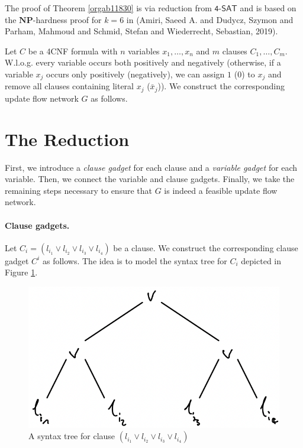 \documentclass[fontsize=11pt,paper=a4]{book}
\begin{document}
The proof of Theorem \ref{orgab11830} is via reduction from \(\textsf{4-SAT}\) and is based on the \(\textbf{NP}\)-hardness proof for \(k=6\) in (Amiri, Saeed A. and Dudycz, Szymon and Parham, Mahmoud and Schmid, Stefan and Wiederrecht, Sebastian, 2019).

Let \(C\) be a 4CNF formula with \(n\) variables \(x_1,\dots,x_n\) and \(m\) clauses \(C_1,\dots,C_m\).
W.l.o.g. every variable occurs both positively and negatively (otherwise, if a variable \(x_j\) occurs only positively (negatively), we can assign \(1\) (\(0\)) to \(x_j\) and remove all clauses containing literal \(x_j\) (\(\bar{x}_j\))).
We construct the corresponding update flow network \(G\) as follows.

\section{The Reduction}
\label{sec:orgffe946d}

First, we introduce a \emph{clause gadget} for each clause and a \emph{variable gadget} for each variable.
Then, we connect the variable and clause gadgets.
Finally, we take the remaining steps necessary to ensure that \(G\) is indeed a feasible update flow network.

\paragraph{Clause gadgets.}
Let \(C_i=(l_{i_1}\vee l_{i_2}\vee l_{i_3}\vee l_{i_4})\) be a clause.
We construct the corresponding clause gadget \(C^i\) as follows.
The idea is to model the syntax tree for \(C_i\) depicted in Figure \ref{fig:org43d1462}.

\begin{figure}[htbp]
\centering
\includegraphics[width=.9\linewidth]{../assets/Screen Shot 2023-02-14 at 15.05.37.png}
\caption{\label{fig:org43d1462}A syntax tree for clause \((l_{i_1}\vee l_{i_2}\vee l_{i_3}\vee l_{i_4})\)}
\end{figure}
\end{document}
